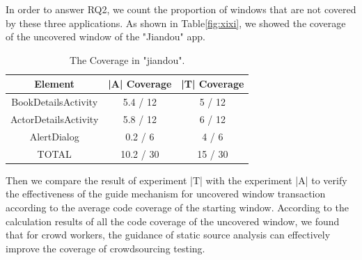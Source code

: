 In order to answer RQ2, we count the proportion of windows that are not covered by these three applications. As shown in Table\ref{fig:xixi}, we showed the coverage of the uncovered window of the "Jiandou" app.
\begin{table}[tb]
\caption{The Coverage in "jiandou".}
\begin{center}
\begin{tabular}{|c|c|c|} %
\hline 
Element&|A| Coverage&|T| Coverage\\
\hline  
BookDetailsActivity&5.4 / 12&5 / 12\\
\hline 
ActorDetailsActivity&5.8 / 12&6 / 12\\
\hline 
AlertDialog&0.2 / 6&4 / 6\\
\hline 
TOTAL&10.2 / 30&15 / 30\\
\hline 
\end{tabular}
\label{fig:table33}
\end{center}
\end{table}

Then we compare the result of experiment |T| with the experiment |A| to verify the effectiveness of the guide mechanism for uncovered window transaction according to the average code coverage of the starting window.
According to the calculation results of all the code coverage of the uncovered window, we found that for crowd workers, the guidance of static source analysis can effectively improve the coverage of crowdsourcing testing.